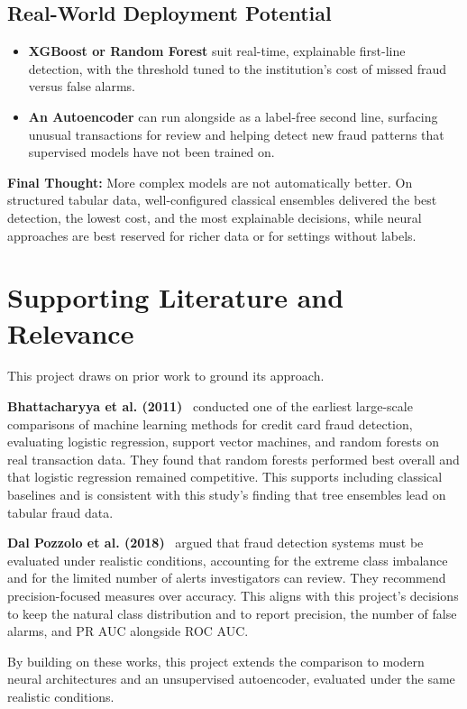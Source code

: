 \documentclass[journal]{IEEEtran}
\begin{document}
\subsection{Real-World Deployment Potential}
\begin{itemize}
  \item \textbf{XGBoost or Random Forest} suit real-time, explainable first-line detection, with the threshold tuned to the institution's cost of missed fraud versus false alarms.
  \item \textbf{An Autoencoder} can run alongside as a label-free second line, surfacing unusual transactions for review and helping detect new fraud patterns that supervised models have not been trained on.
\end{itemize}

\textbf{Final Thought:} More complex models are not automatically better. On structured tabular data, well-configured classical ensembles delivered the best detection, the lowest cost, and the most explainable decisions, while neural approaches are best reserved for richer data or for settings without labels.

\section{Supporting Literature and Relevance}
This project draws on prior work to ground its approach.

\textbf{Bhattacharyya et al. (2011)}~\cite{bhattacharyya} conducted one of the earliest large-scale comparisons of machine learning methods for credit card fraud detection, evaluating logistic regression, support vector machines, and random forests on real transaction data. They found that random forests performed best overall and that logistic regression remained competitive. This supports including classical baselines and is consistent with this study's finding that tree ensembles lead on tabular fraud data.

\textbf{Dal Pozzolo et al. (2018)}~\cite{dalpozzolo} argued that fraud detection systems must be evaluated under realistic conditions, accounting for the extreme class imbalance and for the limited number of alerts investigators can review. They recommend precision-focused measures over accuracy. This aligns with this project's decisions to keep the natural class distribution and to report precision, the number of false alarms, and PR AUC alongside ROC AUC.

By building on these works, this project extends the comparison to modern neural architectures and an unsupervised autoencoder, evaluated under the same realistic conditions.
\end{document}
